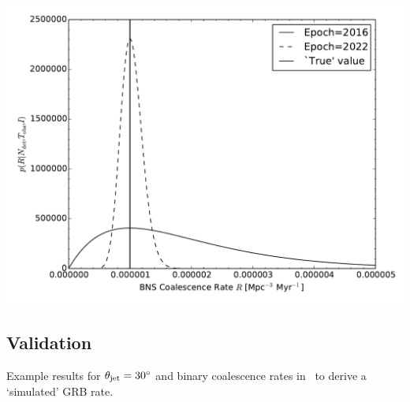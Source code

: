 \documentclass[a0,landscape]{a0poster}
\begin{document}
\begin{multicols}{4}

\begin{center}\vspace{1cm}
    \includegraphics[width=0.5\linewidth]{aligo_rate_re.pdf}
\end{center}\vspace{1cm}


\subsection*{Validation}

\begin{minipage}{\columnwidth}
  \makeatletter
  \newcommand{\@captype}{figure}
  \makeatother
  \centering
  \qquad%
  \caption{Example results for $\theta_{\rm jet}=30^{\circ}$ and binary
  coalescence rates in~\cite{scenarios} to derive a `simulated' GRB rate.}
\end{minipage}


\end{multicols}
\end{document}
